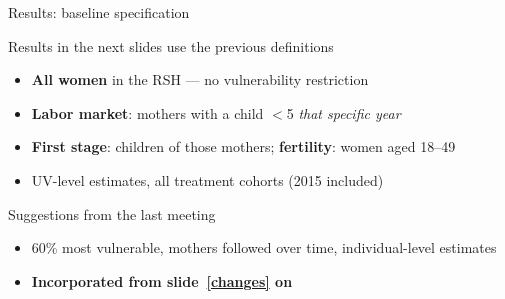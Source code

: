 \documentclass[aspectratio=169,10pt]{beamer}
\newcommand{\takeaway}[1]{\par\vspace{6pt}{\small\textcolor{steel}{$\Rightarrow$}\ \textbf{\textcolor{navy}{#1}}}}
\begin{document}
\begin{frame}{Results: baseline specification}
\begin{block}{Results in the next slides use the previous definitions}
\footnotesize
\begin{itemize}
  \item \textbf{All women} in the RSH --- no vulnerability restriction
  \item \textbf{Labor market}: mothers with a child $<$5 \emph{that specific year}
  \item \textbf{First stage}: children of those mothers; \textbf{fertility}: women aged 18--49
  \item UV-level estimates, all treatment cohorts (2015 included)
\end{itemize}
\end{block}
\vspace{4pt}
\begin{block}{Suggestions from the last meeting}
\footnotesize
\begin{itemize}
  \item 60\% most vulnerable, mothers followed over time, individual-level estimates
  \item \textbf{Incorporated from slide~\ref{changes} on}
\end{itemize}
\end{block}
\takeaway{First the baseline results, then what changes with the new samples.}
\end{frame}
\end{document}
